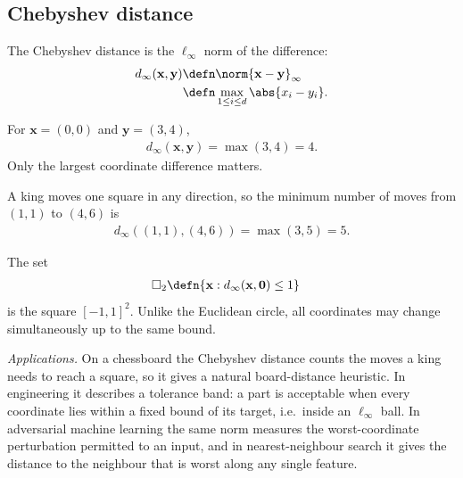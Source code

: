 \documentclass[a4paper, 12pt]{book}
\begin{document}
\subsection{Chebyshev distance}
\begin{definition}
    The Chebyshev distance is the $\ell_\infty$ norm of the difference:
    \begin{align}
        d_\infty(\mathbf{x},\mathbf{y}) &\defn \norm{\mathbf{x}-\mathbf{y}}_\infty\\
        &\defn \max_{1\leq i\leq d}\abs{x_i-y_i}.
    \end{align}
\end{definition}

\begin{example}
    For $\mathbf{x}=(0,0)$ and $\mathbf{y}=(3,4)$,
    \begin{align}
        d_\infty(\mathbf{x},\mathbf{y})=\max(3,4)=4.
    \end{align}
    Only the largest coordinate difference matters.
\end{example}

\begin{example}
    A king moves one square in any direction, so the minimum number of moves from $(1,1)$ to $(4,6)$ is
    \begin{align}
        d_\infty((1,1),(4,6))=\max(3,5)=5.
    \end{align}
\end{example}

\begin{example}
    The set 
    \begin{align}
        \square_2 &\defn \{\mathbf{x}:d_\infty(\mathbf{x},\mathbf{0})\leq1\}    
    \end{align}
    is the square $[-1,1]^2$. Unlike the Euclidean circle, all coordinates may change simultaneously up to the same bound.
\end{example}

\emph{Applications.} On a chessboard the Chebyshev distance counts the moves a
king needs to reach a square, so it gives a natural board-distance heuristic. In
engineering it describes a tolerance band: a part is acceptable when every
coordinate lies within a fixed bound of its target, i.e.\ inside an $\ell_\infty$
ball. In adversarial machine learning the same norm measures the worst-coordinate
perturbation permitted to an input, and in nearest-neighbour search it gives the
distance to the neighbour that is worst along any single feature.
\end{document}
